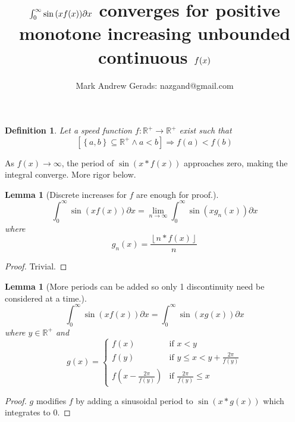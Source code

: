 \documentclass[]{article}
\author{Mark Andrew Gerads: nazgand@gmail.com}
\title{\(\int_{0}^{\infty}\sin\pqty{xf\pqty{x}}\partial x\) converges for positive monotone increasing unbounded continuous \(f\pqty{x}\)}
\newcommand{\pqty}[1]{{\left(#1\right)}}
\newcommand{\Bqty}[1]{{\left\{#1\right\}}}
\newcommand{\bqty}[1]{{\left[#1\right]}}
\newcommand{\floor}[1]{{\left\lfloor#1\right\rfloor}}
\newtheorem{lemma}[theorem]{Lemma}
\newtheorem{definition}[theorem]{Definition}
\numberwithin{equation}{section}
\begin{document}
	
	\maketitle
	
	\begin{definition}
		Let a speed function \(f:\mathbb{R}^+\to\mathbb{R}^+\) exist such that
		\begin{equation}
		\bqty{\Bqty{a,b}\subseteq\mathbb{R}^+\land a<b}
		\Rightarrow
		f\pqty{a}<f\pqty{b}
		\end{equation}
	\end{definition}

	As \(f\pqty{x}\to\infty\), the period of \(\sin\pqty{x*f\pqty{x}}\) approaches zero, making the integral converge. More rigor below.
	
	\begin{lemma}[Discrete increases for \(f\) are enough for proof.]
		\begin{equation}
		\int_{0}^{\infty}\sin\pqty{xf\pqty{x}}\partial x
		=
		\lim\limits_{n\to\infty}\int_{0}^{\infty}\sin\pqty{xg_n\pqty{x}}\partial x
		\end{equation}
		where
		\begin{equation}
			g_n\pqty{x}=\frac{\floor{n*f\pqty{x}}}{n}
		\end{equation}
	\end{lemma}
	\begin{proof}
		Trivial.
	\end{proof}

	\begin{lemma}[More periods can be added so only 1 discontinuity need be considered at a time.]
		\begin{equation}
			\int_{0}^{\infty}\sin\pqty{xf\pqty{x}}\partial x
			=
			\int_{0}^{\infty}\sin\pqty{xg\pqty{x}}\partial x
		\end{equation}
		where \(y\in\mathbb{R}^+\) and
		\begin{equation}
			g\pqty{x}=
			\begin{cases}
				f\pqty{x} & \text{if } x<y\\
				f\pqty{y} & \text{if } y\leq x<y+\frac{2\pi}{f\pqty{y}}\\
				f\pqty{x-\frac{2\pi}{f\pqty{y}}} & \text{if } \frac{2\pi}{f\pqty{y}}\leq x
			\end{cases}
		\end{equation}
	\end{lemma}
	\begin{proof}
		\(g\) modifies \(f\) by adding a sinusoidal period to \(\sin\pqty{x*g\pqty{x}}\) which integrates to \(0\).
	\end{proof}
\end{document}
